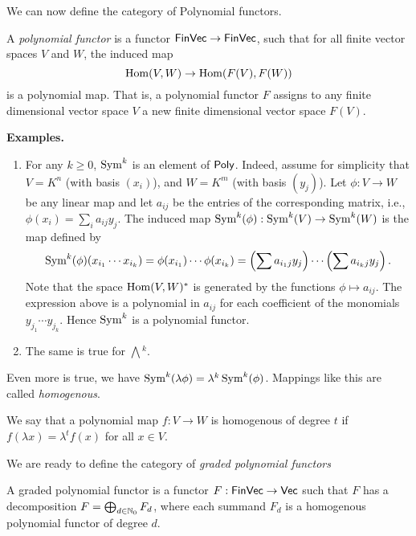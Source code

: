 \documentclass[../main.tex]{subfiles}
\begin{document}
We can now define the category of Polynomial functors.
\begin{defi}
    A \emph{polynomial functor} is a functor $\textnormal{$\textsf{FinVec}$} \to \textnormal{$\textsf{FinVec}$}$, such
    that for all finite vector spaces $V$ and $W$, the induced map
    \begin{equation*}
        \operatorname{Hom}(V, W) \to \operatorname{Hom}(F(V), F(W))
    \end{equation*} is a polynomial map. 
    That is, a polynomial functor $F$ assigns to any finite dimensional vector space $V$ 
    a new finite dimensional vector space $F(V)$. 
\end{defi}

\textbf{Examples.}
\begin{enumerate}[wide, labelindent=0pt,nolistsep]
    \item For any $k \geq 0$, $\operatorname{Sym}^k$ is an element of $\textnormal{$\textsf{Poly}$}$. Indeed, assume for
        simplicity that $V = K^n$ (with basis $(x_i)$), and $W = K^m$ (with
        basis $(y_j)$). Let $\phi: V \to W$ be 
        any linear map and let $a_{ij}$ be the entries of the corresponding matrix, 
        i.e., $\phi(x_i) = \sum_{i} a_{ij}y_j$. 
        The induced map $\operatorname{Sym}^k(\phi): \operatorname{Sym}^k(V) \to \operatorname{Sym}^k(W)$ is the map defined by
        \begin{equation*}
            \operatorname{Sym}^k(\phi)(x_{i_1} \cdots x_{i_k}) = \phi(x_{i_1}) \cdots \phi(x_{i_k})
            = \left(\sum a_{i_1j}y_j \right) \cdots \left(\sum a_{i_kj}y_j \right). 
        \end{equation*}
        Note that the space $\operatorname{Hom}(V,W)^*$ is generated by the functions 
        $\phi \mapsto a_{ij}$. The expression above is a polynomial in $a_{ij}$ for
        each coefficient of the monomials $y_{j_1}\cdots y_{j_k}$. Hence
        $\operatorname{Sym}^k$ is a polynomial functor.
    \item The same is true for $\bigwedge{}^k$.
\end{enumerate}

Even more is true, we have $\operatorname{Sym}^k(\lambda \phi) = \lambda^k \operatorname{Sym}^k(\phi)$. 
Mappings like this are called \emph{homogenous}.
\begin{defi}
    We say that a polynomial map $f: V \to W$ is homogenous of degree $t$ if
    $f(\lambda x) = \lambda^t f(x)$ for all $x \in V$.
\end{defi}

We are ready to define the category of \emph{graded polynomial functors}

\begin{defi}
    A graded polynomial functor is a functor $F: \textnormal{$\textsf{FinVec}$} \to \textnormal{$\textsf{Vec}$}$ such that 
    $F$ has a decomposition $F = \bigoplus_{d \in \mathbb{N}_0} F_d$, where 
    each summand $F_d$ is a homogenous polynomial functor of degree $d$.
\end{defi}
\end{document}
